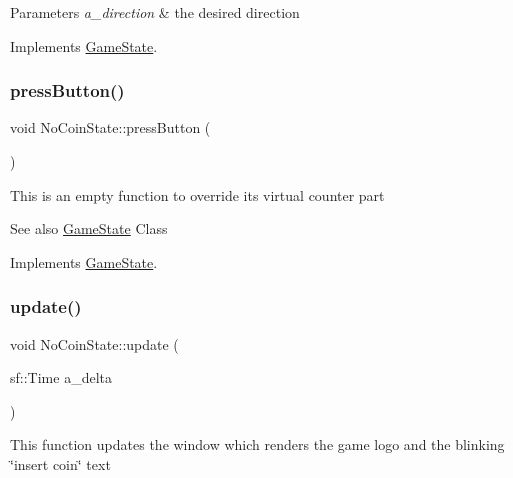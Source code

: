 \begin{DoxyParams}{Parameters}
{\em a\+\_\+direction} & the desired direction \\
\hline
\end{DoxyParams}


Implements \hyperlink{class_game_state_aaae8c1b3ae6969eb2dd81bfc12fbf43f}{Game\+State}.

\mbox{\label{class_no_coin_state_a47dd2924ce9601b45ee11e0d9b8452f7}} 
\subsubsection{\texorpdfstring{press\+Button()}{pressButton()}}
{\footnotesize\ttfamily void No\+Coin\+State\+::press\+Button (\begin{DoxyParamCaption}{ }\end{DoxyParamCaption})\hspace{0.3cm}{\ttfamily [virtual]}}

This is an empty function to override it\textquotesingle{}s virtual counter part \begin{DoxySeeAlso}{See also}
\hyperlink{class_game_state}{Game\+State} Class 
\end{DoxySeeAlso}


Implements \hyperlink{class_game_state_aa14eeaf244bcf19b7013af75cb722dde}{Game\+State}.

\mbox{\label{class_no_coin_state_af0194851310c6df176770713341a8b80}} 
\subsubsection{\texorpdfstring{update()}{update()}}
{\footnotesize\ttfamily void No\+Coin\+State\+::update (\begin{DoxyParamCaption}\item[{sf\+::\+Time}]{a\+\_\+delta }\end{DoxyParamCaption})\hspace{0.3cm}{\ttfamily [virtual]}}

This function updates the window which renders the game logo and the blinking \char`\"{}insert coin\char`\"{} text


